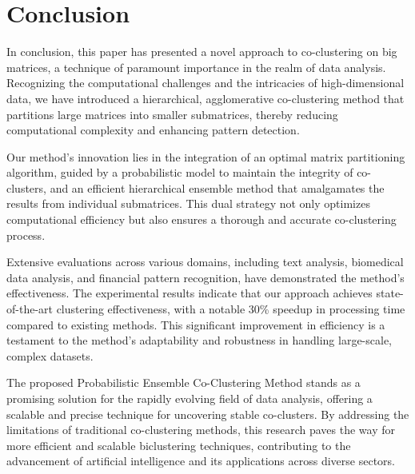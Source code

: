 
\section{Conclusion}

In conclusion, this paper has presented a novel approach to co-clustering on big matrices, a technique of paramount importance in the realm of data analysis. Recognizing the computational challenges and the intricacies of high-dimensional data, we have introduced a hierarchical, agglomerative co-clustering method that partitions large matrices into smaller submatrices, thereby reducing computational complexity and enhancing pattern detection.

Our method's innovation lies in the integration of an optimal matrix partitioning algorithm, guided by a probabilistic model to maintain the integrity of co-clusters, and an efficient hierarchical ensemble method that amalgamates the results from individual submatrices. This dual strategy not only optimizes computational efficiency but also ensures a thorough and accurate co-clustering process.

Extensive evaluations across various domains, including text analysis, biomedical data analysis, and financial pattern recognition, have demonstrated the method's effectiveness. The experimental results indicate that our approach achieves state-of-the-art clustering effectiveness, with a notable 30\% speedup in processing time compared to existing methods. This significant improvement in efficiency is a testament to the method's adaptability and robustness in handling large-scale, complex datasets.

The proposed Probabilistic Ensemble Co-Clustering Method stands as a promising solution for the rapidly evolving field of data analysis, offering a scalable and precise technique for uncovering stable co-clusters. By addressing the limitations of traditional co-clustering methods, this research paves the way for more efficient and scalable biclustering techniques, contributing to the advancement of artificial intelligence and its applications across diverse sectors.

